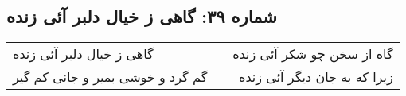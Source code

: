 \begin{center}
\section*{شماره ۳۹: گاهی ز خیال دلبر آئی زنده}
\label{sec:039}
\begin{longtable}{l p{0.5cm} r}
گاهی ز خیال دلبر آئی زنده
&&
گاه از سخن چو شکر آئی زنده
\\
گم گرد و خوشی بمیر و جانی کم گیر
&&
زیرا که به جان دیگر آئی زنده
\\
\end{longtable}
\end{center}
